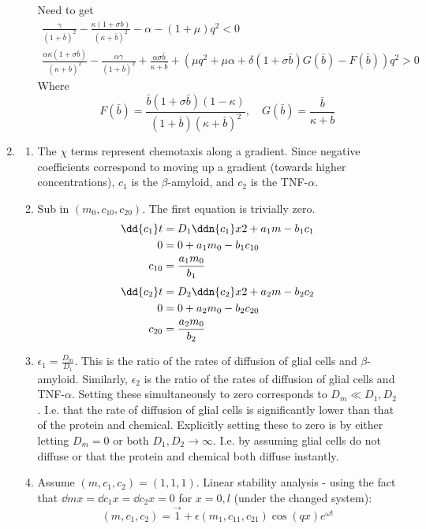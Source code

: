 \documentclass{X:/Documents/Coding/Latex/myassignment}
\begin{document}
\begin{enumerate}
\begin{enumerate}
		Need to get
		\begin{align*}
			\frac{\gamma}{(1 + \bar{b})^2} - \frac{\kappa(1 + \sigma b)}{(\kappa + \bar{b})^2} - \alpha - (1 + \mu)q^2 < 0\\
			\frac{\alpha \kappa (1 + \sigma \bar{b})}{(\kappa + \bar{b})^2} - \frac{\alpha \gamma}{(1 + \bar{b})^2} + \frac{\alpha \sigma \bar{b}}{\kappa + \bar{b}} + \left(\mu q^2 +  \mu \alpha + \delta (1+ \sigma \bar{b}) G(\bar{b}) - F(\bar{b})\right) q^2 > 0
		\end{align*}
		Where
		\[F(\bar{b}) = \frac{\bar{b}(1 + \sigma \bar{b})(1 - \kappa)}{(1 + \bar{b})(\kappa + \bar{b})^2}, \quad G(\bar b) = \frac{\bar{b}}{\kappa + \bar b}\]
	\end{enumerate}
	\item 
	\begin{enumerate}
		\item The $\chi$ terms represent chemotaxis along a gradient. Since negative coefficients correspond to moving up a gradient (towards higher concentrations), $c_1$ is the $\beta$-amyloid, and $c_2$ is the TNF-$\alpha$.
		\item Sub in $(m_0,c_{10},c_{20})$. The first equation is trivially zero.
		\begin{align*}
			\dd{c_1} t &= D_1 \ddn{c_1}x2 + a_1 m - b_1 c_1\\
			0 &= 0 + a_1m_0 - b_1 c_{10}\\
			c_{10} &= \frac{a_1 m_0}{b_1}
		\end{align*}
		\begin{align*}
			\dd{c_2} t &= D_2 \ddn{c_2}x2 + a_2 m - b_2c_2\\
			0 &= 0 + a_2 m_0 - b_2 c_{20}\\
			c_{20} &= \frac{a_2 m_0}{b_2}
		\end{align*}
		\item $\epsilon_1 = \frac{D_m}{D_1}$. This is the ratio of the rates of diffusion of glial cells and $\beta$-amyloid. Similarly, $\epsilon_2$ is the ratio of the rates of diffusion of glial cells and TNF-$\alpha$.
		Setting these simultaneously to zero corresponds to $D_m \ll D_1,D_2$. I.e. that the rate of diffusion of glial cells is significantly lower than that of the protein and chemical. Explicitly setting these to zero is by either letting $D_m = 0$ or both $D_1,D_2 \to \infty$. I.e. by assuming glial cells do not diffuse or that the protein and chemical both diffuse instantly.
		\item Assume $(m,c_1,c_2) = (1,1,1)$. Linear stability analysis - using the fact that $\dd mx = \dd{c_1}x = \dd{c_2} x = 0$ for $x=0,l$ (under the changed system):
		\[(m,c_1,c_2) = \vec 1 + \epsilon (m_1,c_{11},c_{21}) \cos(qx)e^{\omega t}\]


\end{enumerate}
\end{enumerate}
\end{document}
